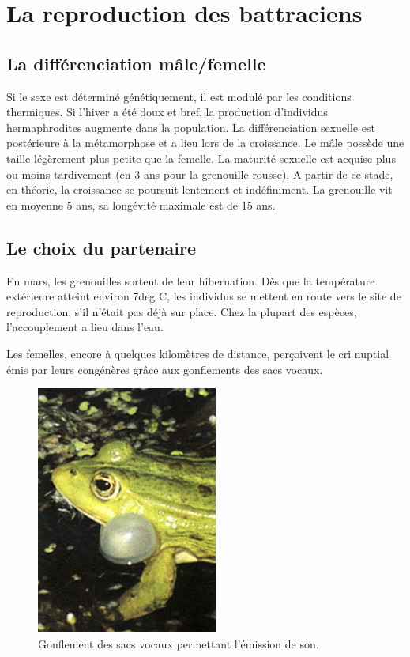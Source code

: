 \section{La reproduction des battraciens}



\subsection{La différenciation mâle/femelle}

Si le sexe est déterminé génétiquement, il est modulé par les conditions thermiques. 
Si l’hiver a été doux et bref, la production d’individus hermaphrodites augmente dans la population.
La différenciation sexuelle est postérieure à la métamorphose et a lieu lors de la croissance.
Le mâle possède une taille légèrement plus petite que la femelle.
La maturité sexuelle est acquise plus ou moins tardivement (en 3 ans pour la grenouille rousse). 
A partir de ce stade, en théorie, la croissance se poursuit lentement et indéfiniment. La grenouille vit en moyenne 5 ans, sa longévité maximale est de 15 ans.
        
\subsection{Le choix du partenaire}

En mars, les grenouilles sortent de leur hibernation.  
Dès que la température extérieure atteint environ 7deg C, les individus se mettent en route vers le site de reproduction, s’il n’était pas déjà sur place. 
Chez la plupart des espèces, l’accouplement a lieu dans l’eau.

Les femelles, encore à quelques kilomètres de distance, perçoivent le cri nuptial émis par leurs congénères grâce aux gonflements des sacs vocaux.


\begin{figure}
	\begin{center}
		\includegraphics[width=.5\textwidth]{laRepro/sacvocal.jpg}
		\caption{Gonflement des sacs vocaux permettant l'émission de son.}%
		\label{fig:grossejoue}
	\end{center}
\end{figure}

